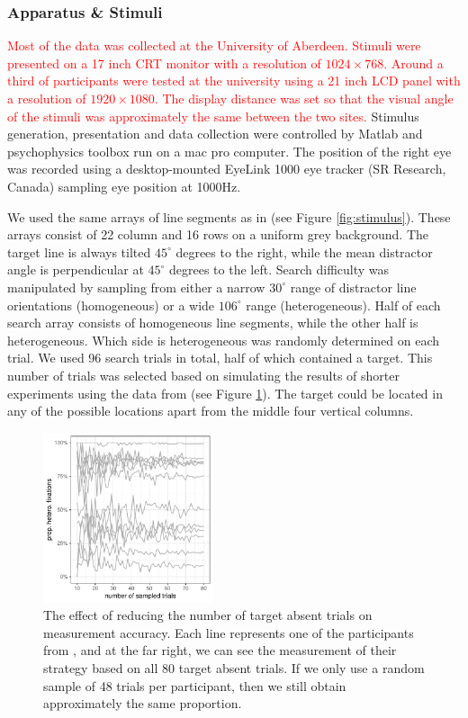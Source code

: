 \documentclass[]{rsos}
\begin{document}
\subsubsection{Apparatus \& Stimuli}

\textcolor{red}{Most of the data was collected at the University of Aberdeen. Stimuli were presented on a 17 inch CRT monitor with a resolution of $1024 \times 768$. Around a third of participants were tested at the university using a 21 inch LCD panel with a resolution of $1920 \times 1080$. The display distance was set so that the visual angle of the stimuli was approximately the same between the two sites.} Stimulus generation, presentation and data collection were controlled by Matlab and psychophysics toolbox \cite{brainard1997,cornelissen2002} run on a mac pro computer. The position of the right eye was recorded using a desktop-mounted EyeLink 1000 eye tracker (SR Research, Canada) sampling eye position at 1000Hz. 

We used the same arrays of line segments as in \cite{nowakowska2017} (see Figure \ref{fig:stimulus}). These arrays consist of 22 column and 16 rows on a uniform grey background. The target line is always tilted $45^{\circ}$ degrees to the right, while the mean distractor angle is perpendicular at $45^{\circ}$ degrees to the left. Search difficulty was manipulated by sampling from either a narrow $30^{\circ}$ range of distractor line orientations (homogeneous) or a wide $106^{\circ}$ range (heterogeneous). Half of each search array consists of homogeneous line segments, while the other half is heterogeneous. Which side is heterogeneous was randomly determined on each trial. We used 96 search trials in total, half of which contained a target. This number of trials was selected based on simulating the results of shorter experiments using the data from \cite{nowakowska2017} (see Figure \ref{fig:num_trials}). The target could be located in any of the possible locations apart from the middle four vertical columns.

\begin{figure}
\centering
 \includegraphics[width=5cm]{Figures/using_smaller_sample_sizes.pdf}
\caption{The effect of reducing the number of target absent trials on measurement accuracy. Each line represents one of the participants from \cite{nowakowska2017}, and at the far right, we can see the measurement of their strategy based on all 80 target absent trials. If we only use a random sample of 48 trials per participant, then we still obtain approximately the same proportion.}
\label{fig:num_trials}
\end{figure}
\end{document}
